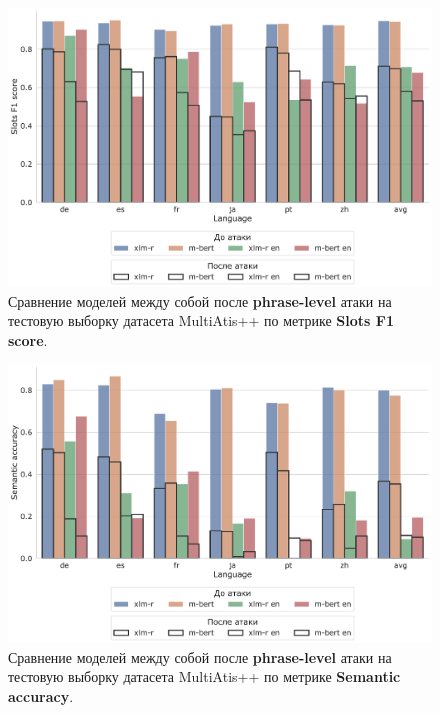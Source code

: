 \begin{figure}[h!]
    \centering
    \includegraphics[width=\textwidth]{images/7}
    \caption{Сравнение моделей между собой после \textbf{phrase-level} атаки на тестовую выборку датасета MultiAtis++ по метрике \textbf{Slots F1 score}.}\label{fig:figure7}
\end{figure}
\begin{figure}[h!]
    \centering
    \includegraphics[width=\textwidth]{images/8}
    \caption{Сравнение моделей между собой после \textbf{phrase-level} атаки на тестовую выборку датасета MultiAtis++ по метрике \textbf{Semantic accuracy}.}\label{fig:figure8}
\end{figure}


